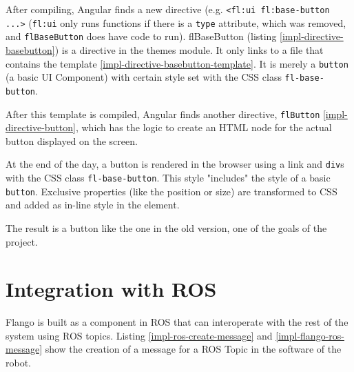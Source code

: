 

After compiling, Angular finds a new directive (e.g.  \lstinline$<fl:ui fl:base-button ...>$ (\texttt{fl:ui} only runs functions if there is a \texttt{type} attribute, which was removed, and \texttt{flBaseButton} does have code to run).
flBaseButton (listing \ref{impl-directive-basebutton}) is a directive in the themes module.
It only links to a file that contains the template \ref{impl-directive-basebutton-template}.
It is merely a \texttt{button} (a basic UI Component) with certain style set with the \ac{CSS} class \texttt{fl-base-button}.




After this template is compiled, Angular finds another directive, \texttt{flButton} \ref{impl-directive-button}, which has the logic to create an \ac{HTML} node for the actual button displayed on the screen.



At the end of the day, a button is rendered in the browser using a link and \texttt{div}s with the \ac{CSS} class \texttt{fl-base-button}.
This style "includes" the style of a basic \texttt{button}.
Exclusive properties (like the position or size) are transformed to \ac{CSS} and added as in-line style in the element.

The result is a button like the one in the old version, one of the goals of the project.


\section{Integration with ROS}
\label{sec:integration-with-ROS}
Flango \cm is built as a component in \ac{ROS} that can interoperate with the rest of the system using \ac{ROS} topics.
Listing \ref{impl-ros-create-message} and \ref{impl-flango-ros-message} show the creation of a message for a ROS Topic in the software of the robot.

